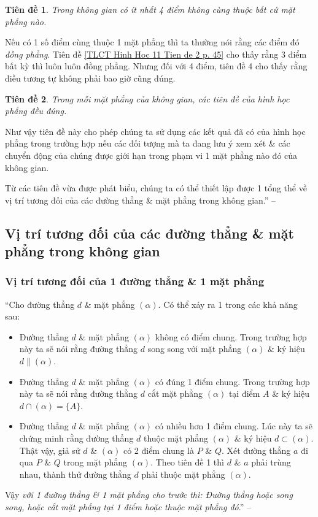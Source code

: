 \documentclass[oneside]{book}
\numberwithin{equation}{section}
\newtheorem{tiende}{Tiên đề}[section]
\begin{document}
\begin{tiende}
	Trong không gian có ít nhất 4 điểm không cùng thuộc bất cứ mặt phẳng nào.
\end{tiende}
Nếu có 1 số điểm cùng thuộc 1 mặt phẳng thì ta thường nói rằng các điểm đó \textit{đồng phẳng}. Tiên đề \ref{TLCT Hinh Hoc 11 Tien de 2 p. 45} cho thấy rằng 3 điểm bất kỳ thì luôn luôn đồng phẳng. Nhưng đối với 4 điểm, tiên đề 4 cho thấy rằng điều tương tự không phải bao giờ cũng đúng.

\begin{tiende}
	Trong mỗi mặt phẳng của không gian, các tiên đề của hình học phẳng đều đúng.
\end{tiende}
Như vậy tiên đề này cho phép chúng ta sử dụng các kết quả đã có của hình học phẳng trong trường hợp nếu các đối tượng mà ta đang lưu ý xem xét \& các chuyển động của chúng được giới hạn trong phạm vi 1 mặt phẳng nào đó của không gian.

Từ các tiên đề vừa được phát biểu, chúng ta có thể thiết lập được 1 tổng thể về vị trí tương đối của các đường thẳng \& mặt phẳng trong không gian.'' -- \cite[pp. 43--45]{TL_chuyen_Toan_Hinh_Hoc_11}

\subsection{Vị trí tương đối của các đường thẳng \& mặt phẳng trong không gian}

\subsubsection{Vị trí tương đối của 1 đường thẳng \& 1 mặt phẳng}
``Cho đường thẳng $d$ \& mặt phẳng $(\alpha)$. Có thể xảy ra 1 trong các khả năng sau:
\begin{itemize}
	\item Đường thẳng $d$ \& mặt phẳng $(\alpha)$ không có điểm chung. Trong trường hợp này ta sẽ nói rằng đường thẳng $d$ song song với mặt phẳng $(\alpha)$ \& ký hiệu $d\parallel(\alpha)$.
	\item Đường thẳng $d$ \& mặt phẳng $(\alpha)$ có đúng 1 điểm chung. Trong trường hợp này ta sẽ nói rằng đường thẳng $d$ cắt mặt phẳng $(\alpha)$ tại điểm $A$ \& ký hiệu $d\cap(\alpha) = \{A\}$.
	\item Đường thẳng $d$ \& mặt phẳng $(\alpha)$ có nhiều hơn 1 điểm chung. Lúc này ta sẽ chứng minh rằng đường thẳng $d$ thuộc mặt phẳng $(\alpha)$ \& ký hiệu $d\subset(\alpha)$. Thật vậy, giả sử $d$ \& $(\alpha)$ có 2 điểm chung là $P$ \& $Q$. Xét đường thẳng $a$ đi qua $P$ \& $Q$ trong mặt phẳng $(\alpha)$. Theo tiên đề 1 thì $d$ \& $a$ phải trùng nhau, thành thử đường thẳng $d$ phải thuộc mặt phẳng $(\alpha)$.
\end{itemize}
Vậy \textit{với 1 đường thẳng \& 1 mặt phẳng cho trước thì: Đường thẳng hoặc song song, hoặc cắt mặt phẳng tại 1 điểm hoặc thuộc mặt phẳng đó}.'' -- \cite[p. 46]{TL_chuyen_Toan_Hinh_Hoc_11}
\end{document}
